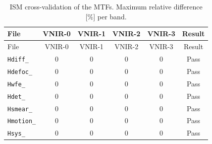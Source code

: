 \begin{longtable}{lccccc}
\caption{ISM cross-validation of the MTFs. Maximum relative difference [\%] per band.}\label{tab:ism_crossval_mtf}\\
\toprule
File & VNIR-0 & VNIR-1 & VNIR-2 & VNIR-3 & Result \\
\midrule
\endfirsthead
\toprule
File & VNIR-0 & VNIR-1 & VNIR-2 & VNIR-3 & Result \\
\midrule
\endhead
\texttt{Hdiff\_} & $0$ & $0$ & $0$ & $0$ & Pass \\
\texttt{Hdefoc\_} & $0$ & $0$ & $0$ & $0$ & Pass \\
\texttt{Hwfe\_} & $0$ & $0$ & $0$ & $0$ & Pass \\
\texttt{Hdet\_} & $0$ & $0$ & $0$ & $0$ & Pass \\
\texttt{Hsmear\_} & $0$ & $0$ & $0$ & $0$ & Pass \\
\texttt{Hmotion\_} & $0$ & $0$ & $0$ & $0$ & Pass \\
\texttt{Hsys\_} & $0$ & $0$ & $0$ & $0$ & Pass \\
\bottomrule
\end{longtable}
